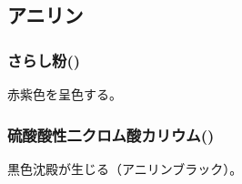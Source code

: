 \subsection{アニリン}
\subsubsection*{さらし粉()}
赤紫色を呈色する。

\subsubsection*{硫酸酸性二クロム酸カリウム()}
黒色沈殿が生じる（アニリンブラック）。
